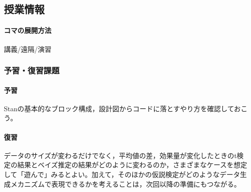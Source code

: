 \subsection{授業情報}
\paragraph{コマの展開方法}
講義/遠隔/演習
\subsubsection{予習・復習課題}
\paragraph{予習}Stanの基本的なブロック構成，設計図からコードに落とすやり方を確認しておこう。
\paragraph{復習}データのサイズが変わるだけでなく，平均値の差，効果量が変化したときのt検定の結果とベイズ推定の結果がどのように変わるのか，さまざまなケースを想定して「遊んで」みるとよい。加えて，そのほかの仮説検定がどのようなデータ生成メカニズムで表現できるかを考えることは，次回以降の準備にもつながる。